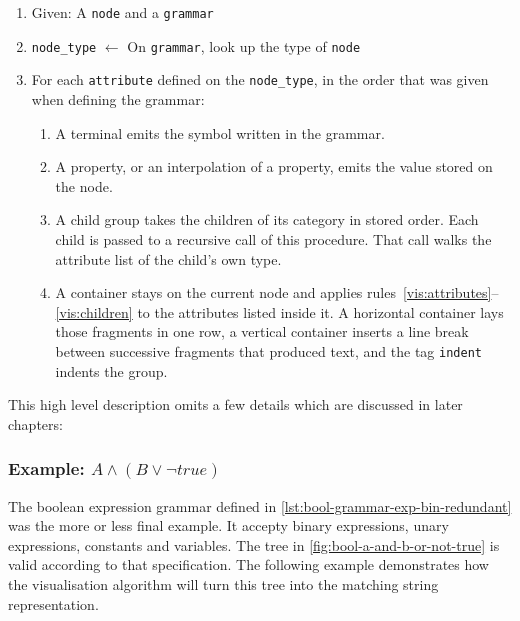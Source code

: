 \documentclass[]{report}
\begin{document}
\begin{enumerate}
  \item \label{vis:given}
    Given: A \texttt{node} and a \texttt{grammar}
  \item \label{vis:attributes}
    \texttt{node\_type} $\gets$ On \texttt{grammar}, look up the type of \texttt{node}
  \item For each \texttt{attribute} defined on the \texttt{node\_type}, in the order that was given when defining the grammar:
    \begin{enumerate}
      \item \label{vis:terminal}
        A terminal emits the symbol written in the grammar.
      \item \label{vis:property}
        A property, or an interpolation of a property, emits the value stored on the node.
      \item \label{vis:children}
        A child group takes the children of its category in stored order. Each child is passed to a recursive call of this procedure. That call walks the attribute list of the child's own type.
      \item \label{vis:container}
        A container stays on the current node and applies rules~\ref{vis:attributes}--\ref{vis:children} to the attributes listed inside it. A horizontal container lays those fragments in one row, a vertical container inserts a line break between successive fragments that produced text, and the tag \texttt{indent} indents the group.
    \end{enumerate}
\end{enumerate}

This high level description omits a few details which are discussed in later chapters:

\subsubsection{Example: $A \land (B \lor \neg true)$}

The boolean expression grammar defined in \cref{lst:bool-grammar-exp-bin-redundant} was the more or less final example. It accepty binary expressions, unary expressions, constants and variables. The tree in \cref{fig:bool-a-and-b-or-not-true} is valid according to that specification. The following example demonstrates how the visualisation algorithm will turn this tree into the matching string representation.
\end{document}
